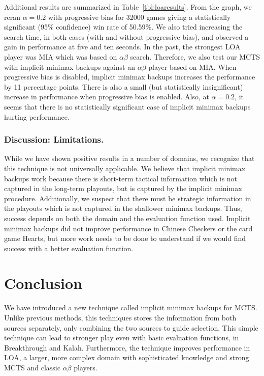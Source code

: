 \documentclass[conference]{IEEEtran}
\begin{document}
Additional results are summarized in Table~\ref{tbl:loaresults}. From the graph, we reran $\alpha = 0.2$ with progressive bias for 
32000 games giving a statistically significant (95\% confidence) win rate of 50.59\%. 
We also tried increasing the search time, in both cases (with and without progressive bias), 
and observed a gain in performance at five and ten seconds. 
In the past, the strongest LOA player was MIA which was based on $\alpha \beta$ search. Therefore, we also test our MCTS with 
implicit minimax backups against an $\alpha \beta$ player based on MIA. When progressive bias is disabled, implicit minimax backups
increases the performance by 11 percentage points. There is also a small (but statistically insignificant) increase in 
performance when progressive bias is enabled. 
Also, at $\alpha = 0.2$, it seems that there is no statistically significant case of implicit minimax backups hurting performance. 

\subsubsection{Discussion: Limitations.} While we have shown positive results in a number of domains, we recognize that this 
technique is not universally applicable. We believe that implicit minimax backups work because there is short-term tactical 
information which 
is not captured in the long-term playouts, but is captured by the implicit minimax procedure. Additionally, we suspect that 
there must be strategic 
information in the playouts which is not captured in the shallower minimax backups. Thus, success depends on both the domain and 
the evaluation function used. Implicit minimax backups did not improve performance in Chinese Checkers or the card game Hearts, 
but more work needs to be done to understand if we would find success with a better evaluation function.

\section{Conclusion}

We have introduced a new technique called implicit minimax backups for MCTS. 
Unlike previous methods, this techniques stores 
the information from both sources separately, only combining the two sources to guide
selection. This simple technique can lead to stronger play even with
basic evaluation functions, in Breakthrough and Kalah. Furthermore, the technique improves 
performance in LOA, a larger, more complex domain with sophisticated knowledge and 
strong MCTS and classic $\alpha \beta$ players.
\end{document}
